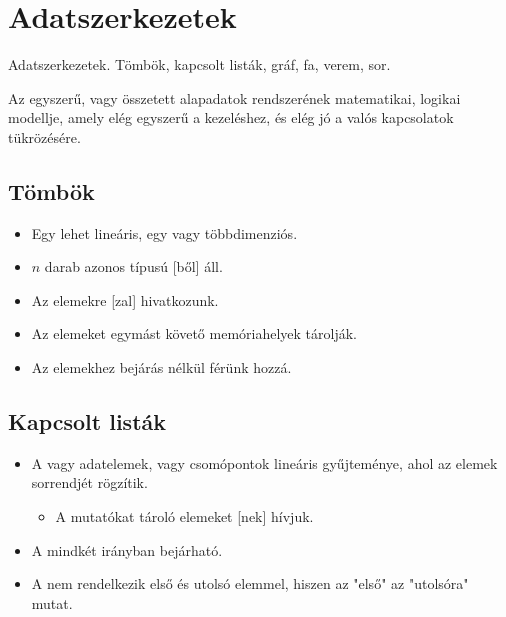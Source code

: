 \documentclass[../../main.tex]{subfiles}
\begin{document}
\section{Adatszerkezetek}

\begin{fulltheorem}
  Adatszerkezetek. Tömbök, kapcsolt listák, gráf, fa, verem, sor.
\end{fulltheorem}

Az  egyszerű, vagy összetett alapadatok rendszerének
matematikai, logikai modellje, amely elég egyszerű a kezeléshez, és elég jó
a valós kapcsolatok tükrözésére.

\subsection{Tömbök}

\begin{itemize}
  \item Egy  lehet lineáris, egy vagy többdimenziós.

  \item $n$ darab azonos típusú [ből] áll.

  \item Az elemekre [zal] hivatkozunk.

  \item Az elemeket egymást követő memóriahelyek tárolják.

  \item Az elemekhez bejárás nélkül férünk hozzá.
\end{itemize}

\subsection{Kapcsolt listák}

\begin{itemize}
  \item A  vagy 
        adatelemek, vagy csomópontok lineáris gyűjteménye,
        ahol az elemek sorrendjét  rögzítik.
        \begin{itemize}
          \item A mutatókat tároló elemeket [nek] hívjuk.
        \end{itemize}

  \item A  mindkét irányban bejárható.

  \item A  nem rendelkezik
        első és utolsó elemmel, hiszen az "első" az "utolsóra" mutat.
\end{itemize}
\end{document}
